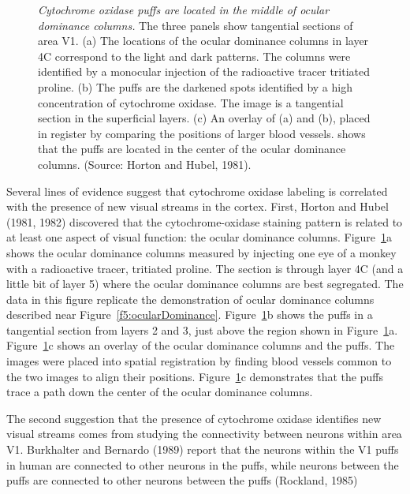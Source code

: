 \begin{figure}
\centerline {
}
\caption[Cytochrome Oxidase Staining and Ocular Dominance]{
{\em Cytochrome oxidase puffs are located 
in the middle of ocular dominance columns.} 
The three panels show tangential sections of area V1.
(a) The locations of the ocular dominance columns in
layer 4C correspond to the light and dark patterns.
The columns were identified
by a monocular injection of the radioactive
tracer tritiated proline.
(b) The puffs are the darkened spots
identified by a high concentration of cytochrome oxidase.
The image is a tangential section in the superficial layers.
(c) An overlay of (a) and (b),
placed in register by comparing the positions
of larger blood vessels.
shows that the puffs are located in
the center of the ocular dominance columns.
(Source: Horton and Hubel, 1981).
}
\label{f5:blobs.vs.od}
\end{figure}
Several lines of evidence suggest that
cytochrome oxidase labeling is correlated with
the presence of new visual streams in the cortex.
First, Horton and Hubel (1981, 1982) discovered that
the cytochrome-oxidase staining pattern is related to
at least one aspect of visual function:
the ocular dominance columns.
Figure~\ref{f5:blobs.vs.od}a shows the ocular dominance columns
measured by injecting one eye of a monkey with a radioactive
tracer, tritiated proline.
The section is through layer 4C
(and a little bit of layer 5) where the ocular
dominance columns are best segregated.
The data in this figure replicate the demonstration of ocular
dominance columns described near Figure~\ref{f5:ocularDominance}.
Figure~\ref{f5:blobs.vs.od}b shows the puffs in a tangential
section from layers 2 and 3, just above the region
shown in Figure~\ref{f5:blobs.vs.od}a.
Figure~\ref{f5:blobs.vs.od}c shows an overlay
of the ocular dominance columns and the puffs.
The images were placed into spatial registration 
by finding blood vessels common to the two images
to align their positions.
Figure~\ref{f5:blobs.vs.od}c demonstrates that the puffs trace a path
down the center of the ocular dominance columns.

The second suggestion that the presence of cytochrome
oxidase identifies new visual streams comes from
studying the connectivity between neurons within area V1.
Burkhalter and Bernardo (1989) report that
the neurons within the V1 puffs in human are connected to
other neurons in the puffs, while neurons
between the puffs are connected to other neurons
between the puffs (Rockland, 1985)

